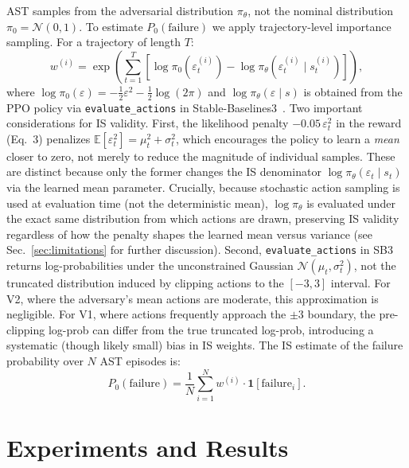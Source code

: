 \documentclass[conference]{IEEEtran}
\newcommand{\mathds}[1]{\mathbf{#1}}
\begin{document}
AST samples from the adversarial distribution $\pi_\theta$, not the nominal
distribution $\pi_0 = \mathcal{N}(0,1)$. To estimate $P_0(\text{failure})$
we apply trajectory-level importance sampling. For a trajectory of length $T$:
\begin{equation}
  w^{(i)} = \exp\!\left(\sum_{t=1}^{T}
    \left[\log \pi_0\!\left(\varepsilon_t^{(i)}\right)
          - \log \pi_\theta\!\left(\varepsilon_t^{(i)} \mid s_t^{(i)}\right)
    \right]\right),
\end{equation}
where $\log \pi_0(\varepsilon) = -\tfrac{1}{2}\varepsilon^2 - \tfrac{1}{2}\log(2\pi)$
and $\log \pi_\theta(\varepsilon \mid s)$ is obtained from the PPO policy via
\texttt{evaluate\_actions} in Stable-Baselines3~\cite{raffin2021sb3}.
Two important considerations for IS validity. First, the likelihood penalty
$-0.05\,\varepsilon_t^2$ in the reward (Eq.~3) penalizes
$\mathbb{E}[\varepsilon_t^2] = \mu_t^2 + \sigma_t^2$, which
encourages the policy to learn a \emph{mean} closer to zero, not merely to
reduce the magnitude of individual samples. These are distinct because only the
former changes the IS denominator $\log\pi_\theta(\varepsilon_t\mid s_t)$ via
the learned mean parameter. Crucially, because stochastic action sampling is
used at evaluation time (not the deterministic mean), $\log\pi_\theta$ is
evaluated under the exact same distribution from which actions are drawn,
preserving IS validity regardless of how the penalty shapes the learned mean
versus variance (see Sec.~\ref{sec:limitations} for further discussion).
Second, \texttt{evaluate\_actions} in SB3 returns log-probabilities under the
unconstrained Gaussian $\mathcal{N}(\mu_t,\sigma_t^2)$, not the truncated
distribution induced by clipping actions to the $[-3,3]$ interval. For V2, where the
adversary's mean actions are moderate, this approximation is negligible. For
V1, where actions frequently approach the $\pm 3$ boundary, the pre-clipping
log-prob can differ from the true truncated log-prob, introducing a systematic
(though likely small) bias in IS weights.
The IS estimate of the failure probability over $N$ AST episodes is:
\begin{equation}
  \hat{P}_0(\text{failure}) = \frac{1}{N}\sum_{i=1}^{N} w^{(i)} \cdot \mathds{1}[\text{failure}_i].
\end{equation}

\section{Experiments and Results}
\end{document}
